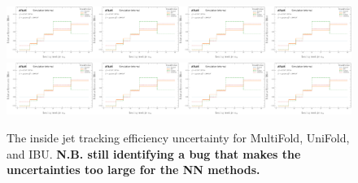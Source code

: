 \begin{figure}[h!]
\includegraphics[width=0.25\textwidth,page=10]{figures/SimResults/TrackJet_SystEffect.pdf}\includegraphics[width=0.25\textwidth,page=14]{figures/SimResults/TrackJet_SystEffect.pdf}\includegraphics[width=0.25\textwidth,page=42]{figures/SimResults/TrackJet_SystEffect.pdf}\includegraphics[width=0.25\textwidth,page=46]{figures/SimResults/TrackJet_SystEffect.pdf}\\
\includegraphics[width=0.25\textwidth,page=50]{figures/SimResults/TrackJet_SystEffect.pdf}\includegraphics[width=0.25\textwidth,page=54]{figures/SimResults/TrackJet_SystEffect.pdf}\includegraphics[width=0.25\textwidth,page=58]{figures/SimResults/TrackJet_SystEffect.pdf}\includegraphics[width=0.25\textwidth,page=62]{figures/SimResults/TrackJet_SystEffect.pdf}
\caption{The inside jet tracking efficiency uncertainty for MultiFold, UniFold, and IBU.  \textbf{N.B. still identifying a bug that makes the uncertainties too large for the NN methods.}}
\label{fig:simresultsmulti_trackjetuncertsl2}
\end{figure}

